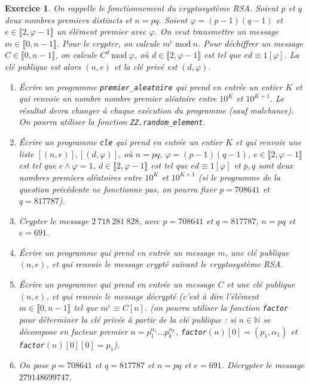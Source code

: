\documentclass[11pt,a4paper]{article}
\newtheorem{ex}{Exercice}
\newcommand{\N}{\mathbb{N}}
\begin{document}
\begin{ex}
On rappelle le fonctionnement du cryptosystème RSA. Soient $p$ et $q$ deux nombres premiers distincts  et $n=pq$. Soient $\varphi=(p-1)(q-1)$ et $e\in \llbracket 2,\varphi-1\rrbracket$ un élément premier avec $\varphi$. On veut transmettre un message $m\in \llbracket 0,n-1 \rrbracket$. Pour le crypter, on calcule $m^e\mathrm{\ mod\ }n$. Pour déchiffrer un message $C\in \llbracket 0,n-1\rrbracket$, on calcule $C^d\mathrm{\ mod\ }\varphi$, où $d\in \llbracket 2,\varphi-1\rrbracket$ est tel que $ed\equiv 1[\varphi]$.  La clé publique est alors $(n,e)$ et la clé privé est $(d,\varphi)$. 

\begin{enumerate}
\item Écrire un programme \texttt{premier\_aleatoire} qui prend en entrée un entier $K$ et qui renvoie un nombre nombre premier aléatoire entre $10^K$ et $10^{K+1}$. Le résultat devra changer à chaque exécution du programme (sauf malchance). On pourra utiliser la fonction \texttt{ZZ.random\_element}.

\item Écrire un programme \texttt{cle} qui prend en entrée un entier $K$ et qui renvoie une liste $[(n,e)],[(d,\varphi)]$, où $n=pq$, $\varphi=(p-1)(q-1)$, $e\in \llbracket 2,\varphi-1\rrbracket$ est tel que $e\wedge \varphi=1$, $d\in \llbracket 2,\varphi-1\rrbracket$ est tel que $ed\equiv 1[\varphi]$ et $p,q$ sont deux nombres premiers aléatoires entre $10^K$ et $10^{K+1}$ (si le programme de la question précédente ne fonctionne pas, on pourra fixer $p=708641$ et $q=817787$).

\item Crypter le message $2\  718\  281\ 828$, avec $p=708641$ et $q=817787$, $n=pq$ et $e=691$.

\item Écrire un programme qui prend en entrée un message $m$, une clé publique $(n,e)$, et qui renvoie le message crypté suivant le cryptosystème RSA.

\item Écrire un programme qui prend en entrée un message $C$ et une clé publique $(n,e)$, et qui renvoie le message décrypté (c'est à dire l'élément $m\in \llbracket 0,n-1\rrbracket$ tel que $m^e\equiv C[n]$. (on pourra utiliser la fonction \texttt{factor} pour déterminer la clé privée à partir de la clé publique :  si $n\in \N$ se décompose en facteur premier $n=p_1^{\alpha_1}\ldots p_k^{\alpha_k}$, \texttt{factor}$(n)[0]=(p_1,\alpha_1)$ et  \texttt{factor}$(n)[0][0]=p_1$).

\item On pose $p=708641$ et $q=817787$ et $n=pq$ et $e=691$. Décrypter le message $279148699747$. 
\end{enumerate}

\end{ex}
\end{document}
